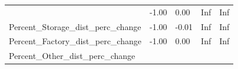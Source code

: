 \documentclass[]{article}
\begin{document}
\begin{longtable}[]{@{}lllll@{}}
\begin{minipage}[t]{0.49\columnwidth}
\end{minipage} & \begin{minipage}[t]{0.08\columnwidth}\raggedright\strut
-1.00\strut
\end{minipage} & \begin{minipage}[t]{0.09\columnwidth}\raggedright\strut
0.00\strut
\end{minipage} & \begin{minipage}[t]{0.09\columnwidth}\raggedright\strut
Inf\strut
\end{minipage} & \begin{minipage}[t]{0.11\columnwidth}\raggedright\strut
Inf\strut
\end{minipage}\tabularnewline
\begin{minipage}[t]{0.49\columnwidth}\raggedright\strut
Percent\_Storage\_dist\_perc\_change\strut
\end{minipage} & \begin{minipage}[t]{0.08\columnwidth}\raggedright\strut
-1.00\strut
\end{minipage} & \begin{minipage}[t]{0.09\columnwidth}\raggedright\strut
-0.01\strut
\end{minipage} & \begin{minipage}[t]{0.09\columnwidth}\raggedright\strut
Inf\strut
\end{minipage} & \begin{minipage}[t]{0.11\columnwidth}\raggedright\strut
Inf\strut
\end{minipage}\tabularnewline
\begin{minipage}[t]{0.49\columnwidth}\raggedright\strut
Percent\_Factory\_dist\_perc\_change\strut
\end{minipage} & \begin{minipage}[t]{0.08\columnwidth}\raggedright\strut
-1.00\strut
\end{minipage} & \begin{minipage}[t]{0.09\columnwidth}\raggedright\strut
0.00\strut
\end{minipage} & \begin{minipage}[t]{0.09\columnwidth}\raggedright\strut
Inf\strut
\end{minipage} & \begin{minipage}[t]{0.11\columnwidth}\raggedright\strut
Inf\strut
\end{minipage}\tabularnewline
\begin{minipage}[t]{0.49\columnwidth}\raggedright\strut
Percent\_Other\_dist\_perc\_change\strut
\end{minipage} & \begin{minipage}[t]{0.08\columnwidth}\raggedright\strut

\end{minipage}
\end{longtable}
\end{document}
